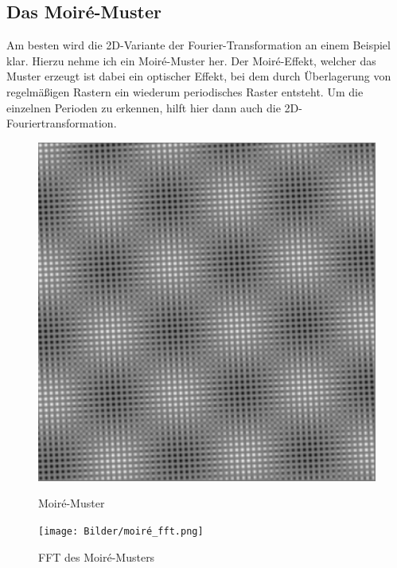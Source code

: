 \documentclass[a4paper,12pt]{article}
\theoremstyle{definition}
\theoremstyle{remark}
\begin{document}
\subsection{Das Moiré-Muster}
Am besten wird die 2D-Variante der Fourier-Transformation an einem Beispiel klar. Hierzu nehme ich ein Moiré-Muster her. Der Moiré-Effekt, welcher 
das Muster erzeugt ist dabei ein optischer Effekt, bei dem durch Überlagerung von regelmäßigen Rastern ein wiederum periodisches Raster entsteht.
Um die einzelnen Perioden zu erkennen, hilft hier dann auch die 2D-Fouriertransformation.

\begin{figure}[H]
  \centering
  \begin{minipage}{0.49\textwidth}
    \centering
    \includegraphics[width=\linewidth]{Bilder/moiré.png}
    \caption{Moiré-Muster}
    \label{fig:bild1}
  \end{minipage}
  \hfill
  \begin{minipage}{0.49\textwidth}
    \centering
    \texttt{[image: Bilder/moiré\_fft.png]}
    \caption{FFT des Moiré-Musters}
    \label{fig:bild2}
  \end{minipage}
\end{figure}
\end{document}
